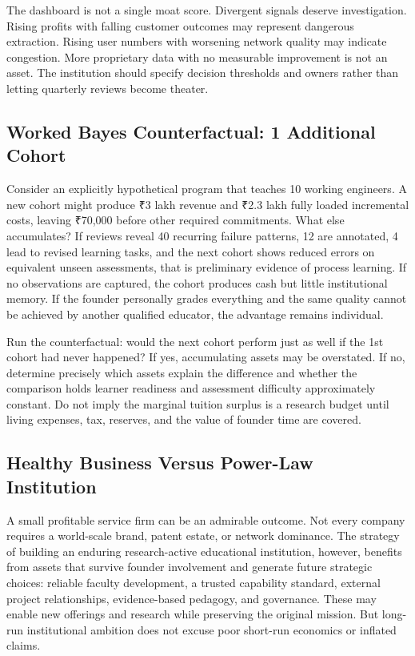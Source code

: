 The dashboard is not a single moat score. Divergent signals deserve investigation. Rising profits with falling customer outcomes may represent dangerous extraction. Rising user numbers with worsening network quality may indicate congestion. More proprietary data with no measurable improvement is not an asset. The institution should specify decision thresholds and owners rather than letting quarterly reviews become theater.

\subsection{Worked Bayes Counterfactual: 1 Additional Cohort}
\label{sec:worked_bayes_counterfactual}

Consider an explicitly hypothetical program that teaches 10 working engineers. A new cohort might produce ₹3 lakh revenue and ₹2.3 lakh fully loaded incremental costs, leaving ₹70,000 before other required commitments. What else accumulates? If reviews reveal 40 recurring failure patterns, 12 are annotated, 4 lead to revised learning tasks, and the next cohort shows reduced errors on equivalent unseen assessments, that is preliminary evidence of process learning. If no observations are captured, the cohort produces cash but little institutional memory. If the founder personally grades everything and the same quality cannot be achieved by another qualified educator, the advantage remains individual.

Run the counterfactual: would the next cohort perform just as well if the 1st cohort had never happened? If yes, accumulating assets may be overstated. If no, determine precisely which assets explain the difference and whether the comparison holds learner readiness and assessment difficulty approximately constant. Do not imply the marginal tuition surplus is a research budget until living expenses, tax, reserves, and the value of founder time are covered.

\subsection{Healthy Business Versus Power-Law Institution}
\label{sec:healthy_business_vs_power_law_institution}

A small profitable service firm can be an admirable outcome. Not every company requires a world-scale brand, patent estate, or network dominance. The strategy of building an enduring research-active educational institution, however, benefits from assets that survive founder involvement and generate future strategic choices: reliable faculty development, a trusted capability standard, external project relationships, evidence-based pedagogy, and governance. These may enable new offerings and research while preserving the original mission. But long-run institutional ambition does not excuse poor short-run economics or inflated claims.

